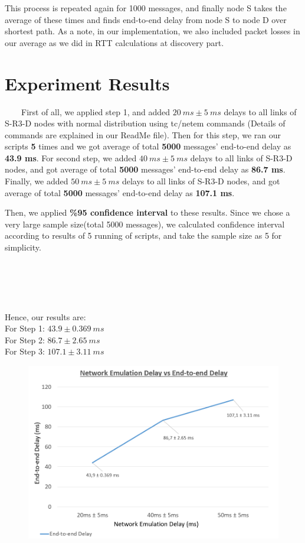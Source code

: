 \documentclass[12pt]{article}
\begin{document}
This process is repeated again for 1000 messages, and finally node S takes the average of these times and finds end-to-end delay from node S to node D over shortest path. As a note, in our implementation, we also included packet losses in our average as we did in RTT calculations at discovery part.

\section{Experiment Results}
\ \ \ \ First of all, we applied step 1, and added $20 \ ms \pm 5 \ ms$ delays to all links of S-R3-D nodes with normal distribution using tc/netem commands (Details of commands are explained in our ReadMe file). Then for this step, we ran our scripts \textbf{5} times and we got average of total \textbf{5000} messages' end-to-end delay as \textbf{43.9 ms}. For second step, we added $40 \ ms \pm 5 \ ms$ delays to all links of S-R3-D nodes, and got  average of total \textbf{5000} messages' end-to-end delay as \textbf{86.7 ms}. Finally, we added $50 \ ms \pm 5 \ ms$ delays to all links of S-R3-D nodes, and got average of total \textbf{5000} messages' end-to-end delay as \textbf{107.1 ms}.

Then, we applied \textbf{\%95 confidence interval} to these results. Since we chose a very large sample size(total 5000 messages), we calculated confidence interval according to results of 5 running of scripts, and take the sample size as 5 for simplicity. \\
\\
\\
\\
\\
\\
Hence, our results are: \\
For Step 1: $43.9 \pm 0.369 \ ms$ \\
For Step 2: $86.7 \pm 2.65 \ ms$ \\
For Step 3: $107.1 \pm 3.11 \ ms$ \\

\begin{figure}[h!]
  \includegraphics[width=\linewidth]{435graph.png}
\end{figure}
\end{document}
